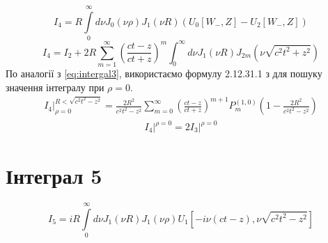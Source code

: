 \begin{equation}
I_4 = R \int \limits_{0}^{\infty} d \nu J_0(\nu \rho) J_1(\nu R) 
(U_0[ W_-, Z ] - U_2[ W_-, Z ])
\end{equation}
%
\begin{equation}
I_4 = I_2 + 2 R \sum_{m=1}^{\infty} \left( \frac{ct - z}{ct + z} \right)^m 
\int_{0}^{\infty} d \nu J_1(\nu R) J_{2m} (\nu \sqrt{c^2t^2 + z^2})
\end{equation}
%
По аналогії з \eqref{eq:intergal3}, використаємо формулу 2.12.31.1 з 
\cite[ст. 209]{imp:SpecFunc1983} для пошуку значення інтегралу при $ \rho = 0 $.
%
\begin{equation*} \begin{aligned}
\left. I_4 \right|_{\rho = 0}^{R < \sqrt{c^2 t^2 - z^2}} = 
\frac{2 R^2}{c^2 t^2 - z^2} \sum_{m=0}^{\infty} 
\left( \frac{ct - z}{ct + z} \right)^{m+1} P_{m}^{(1,0)} 
\left( 1 - \frac{2R^2}{c^2 t^2 - z^2} \right)
\end{aligned} \end{equation*}
%
\begin{equation} \begin{aligned}
\left. I_4 \right|^{\rho = 0} = 2 \left. I_3 \right|^{\rho = 0}
\end{aligned} \end{equation}

\section{Інтеграл 5}

\begin{equation}
I_5 = i R \int \limits_{0}^{\infty} d \nu 
J_1 \left( \nu R \right) J_1 \left( \nu \rho \right)
U_1 \left[ - i \nu \left( ct - z \right), \nu \sqrt{c^2t^2 - z^2} \right]
\end{equation}
